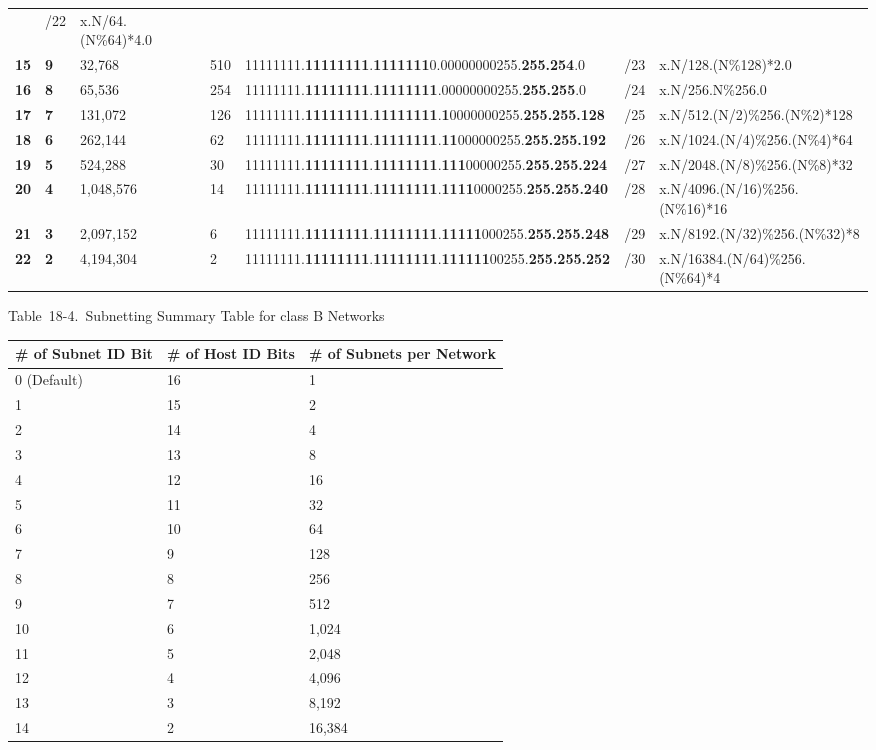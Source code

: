 \begin{longtable}[]{@{}lllllll@{}}
& /22 & x.N/64.(N\%64)*4.0\tabularnewline
{\textbf{15}} & {\textbf{9}} & 32,768 & 510 &
11111111.{\textbf{11111111}}.{\textbf{1111111}}0.00000000255.{\textbf{255.254}}.0
& /23 & x.N/128.(N\%128)*2.0\tabularnewline
{\textbf{16}} & {\textbf{8}} & 65,536 & 254 &
11111111.{\textbf{11111111}}.{\textbf{11111111}}.00000000255.{\textbf{255.255}}.0
& /24 & x.N/256.N\%256.0\tabularnewline
{\textbf{17}} & {\textbf{7}} & 131,072 & 126 &
11111111.{\textbf{11111111}}.{\textbf{11111111}}.{\textbf{1}}0000000255.{\textbf{255.255.128}}
& /25 & x.N/512.(N/2)\%256.(N\%2)*128\tabularnewline
{\textbf{18}} & {\textbf{6}} & 262,144 & 62 &
11111111.{\textbf{11111111}}.{\textbf{11111111}}.{\textbf{11}}000000255.{\textbf{255.255.192}}
& /26 & x.N/1024.(N/4)\%256.(N\%4)*64\tabularnewline
{\textbf{19}} & {\textbf{5}} & 524,288 & 30 &
11111111.{\textbf{11111111}}.{\textbf{11111111}}.{\textbf{111}}00000255.{\textbf{255.255.224}}
& /27 & x.N/2048.(N/8)\%256.(N\%8)*32\tabularnewline
{\textbf{20}} & {\textbf{4}} & 1,048,576 & 14 &
11111111.{\textbf{11111111}}.{\textbf{11111111}}.{\textbf{1111}}0000255.{\textbf{255.255.240}}
& /28 & x.N/4096.(N/16)\%256.(N\%16)*16\tabularnewline
{\textbf{21}} & {\textbf{3}} & 2,097,152 & 6 &
11111111.{\textbf{11111111}}.{\textbf{11111111}}.{\textbf{11111}}000255.{\textbf{255.255.248}}
& /29 & x.N/8192.(N/32)\%256.(N\%32)*8\tabularnewline
{\textbf{22}} & {\textbf{2}} & 4,194,304 & 2 &
11111111.{\textbf{11111111}}.{\textbf{11111111}}.{\textbf{111111}}00255.{\textbf{255.255.252}}
& /30 & x.N/16384.(N/64)\%256.(N\%64)*4\tabularnewline
\bottomrule
\end{longtable}

\protect\hypertarget{ch18s07.htmlux5cux23subnetting_summary_table_for_class_b_net}{}{}

Table~18-4.~Subnetting Summary Table for class B Networks

\begin{longtable}[]{@{}lll@{}}
\toprule
\# of Subnet ID Bit & \# of Host ID Bits & \# of Subnets per
Network\tabularnewline
\midrule
\endhead
0 (Default) & 16 & 1\tabularnewline
1 & 15 & 2\tabularnewline
2 & 14 & 4\tabularnewline
3 & 13 & 8\tabularnewline
4 & 12 & 16\tabularnewline
5 & 11 & 32\tabularnewline
6 & 10 & 64\tabularnewline
7 & 9 & 128\tabularnewline
8 & 8 & 256\tabularnewline
9 & 7 & 512\tabularnewline
10 & 6 & 1,024\tabularnewline
11 & 5 & 2,048\tabularnewline
12 & 4 & 4,096\tabularnewline
13 & 3 & 8,192\tabularnewline
14 & 2 & 16,384\tabularnewline
\bottomrule
\end{longtable}

